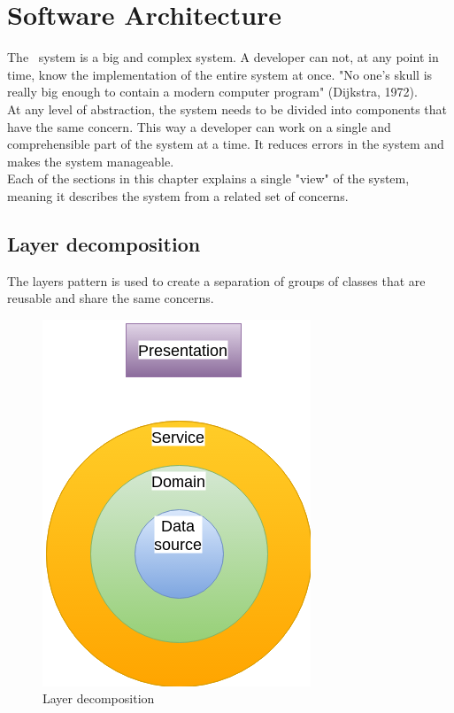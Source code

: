 \chapter{Software Architecture}
\label{ch:software}

The \ShortName~system is a big and complex system. A developer can not, at any point in time, know the implementation of the entire system at once. "No one's skull is really big enough to contain a modern computer program" (Dijkstra, 1972).\\
At any level of abstraction, the system needs to be divided into components that have the same concern. This way a developer can work on a single and comprehensible part of the system at a time. It reduces errors in the system and makes the system manageable.\\
Each of the sections in this chapter explains a single "view" of the system, meaning it describes the system from a related set of concerns.

\section{Layer decomposition}
The layers pattern is used to create a separation of groups of classes that are reusable and share the same concerns.

\begin{figure}[H]
\centering
\includegraphics[scale=0.7]{7-software/images/LayersCircle.png}
\caption{Layer decomposition}
\label{fig:layerscircle}
\end{figure}

